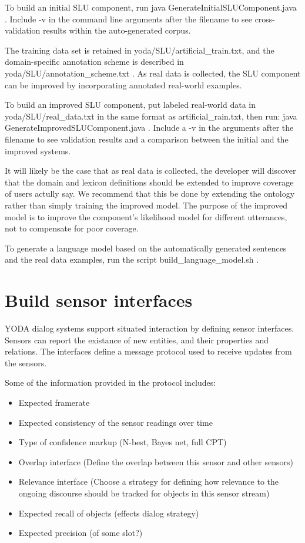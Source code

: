 \documentclass[10pt]{article}
\begin{document}
To build an initial SLU component, run java GenerateInitialSLUComponent.java .
Include -v in the command line arguments after the filename to see cross-validation results within the auto-generated corpus.

The training data set is retained in yoda/SLU/artificial\_train.txt, and the domain-specific annotation scheme is described in yoda/SLU/annotation\_scheme.txt .
As real data is collected, the SLU component can be improved by incorporating annotated real-world examples.

To build an improved SLU component, put labeled real-world data in yoda/SLU/real\_data.txt in the same format as artificial\_rain.txt, then run: java GenerateImprovedSLUComponent.java .
Include a -v in the arguments after the filename to see validation results and a comparison between the initial and the improved systems.

It will likely be the case that as real data is collected, the developer will discover that the domain and lexicon definitions should be extended to improve coverage of users actully say.
We recommend that this be done by extending the ontology rather than simply training the improved model.
The purpose of the improved model is to improve the component's likelihood model for different utterances, not to compensate for poor coverage.

To generate a language model based on the automatically generated sentences and the real data examples, run the script build\_language\_model.sh .


\section {Build sensor interfaces}
YODA dialog systems support situated interaction by defining sensor interfaces.
Sensors can report the existance of new entities, and their properties and relations.
The interfaces define a message protocol used to receive updates from the sensors.

Some of the information provided in the protocol includes:
\begin{itemize}
\item Expected framerate
\item Expected consistency of the sensor readings over time
\item Type of confidence markup (N-best, Bayes net, full CPT)
\item Overlap interface (Define the overlap between this sensor and other sensors)
\item Relevance interface (Choose a strategy for defining how relevance to the ongoing discourse should be tracked for objects in this sensor stream)
\item Expected recall of objects (effects dialog strategy)
\item Expected precision (of some slot?)
\end{itemize}
\end{document}
